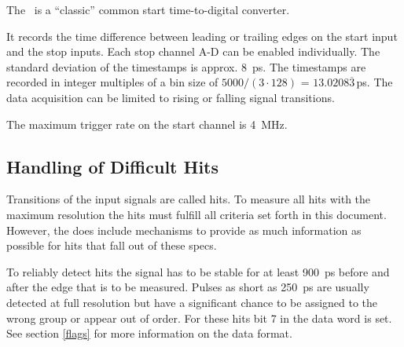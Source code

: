  { %
The \deviceName\ is a ``classic'' common start time-to-digital converter. 

It records the time difference between leading or trailing edges on the start input and the stop inputs. 
Each stop channel A-D can be enabled individually. 
The standard deviation of the timestamps is approx. \SI{8}{\pico\second}. 
The timestamps are recorded in integer multiples of a bin size of $5000/(3\cdot 128)$ = $13.0208\overline{3}$\,\si{\pico\second}. 
The data acquisition can be limited to rising or falling signal transitions. 

The maximum trigger rate on the start channel is \SI{4}{\mega\hertz}.

\subsection{Handling of Difficult Hits}
    \label{difficulthits}
    Transitions of the input signals are called hits. To measure all hits with the maximum resolution the hits must fulfill all criteria set forth in this document.
    However, the \deviceName does include mechanisms to provide as much information as possible for hits that fall out of these specs.

    To reliably detect hits the signal has to be stable for at least \SI{900}{\pico\second} before and after the edge that is to be measured. 
    Pulses as short as \SI{250}{\pico\second} are usually detected at full resolution but have a significant chance to be assigned to the wrong group or appear out of order. 
    For these hits bit 7 in the data word is set. See section \ref{flags} for more information on the data format.

}
